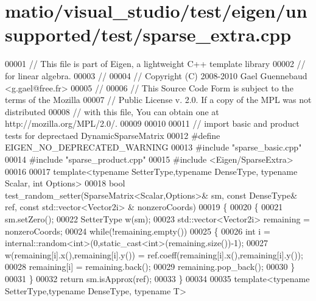 \hypertarget{matio_2visual__studio_2test_2eigen_2unsupported_2test_2sparse__extra_8cpp_source}{}\section{matio/visual\+\_\+studio/test/eigen/unsupported/test/sparse\+\_\+extra.cpp}
\label{matio_2visual__studio_2test_2eigen_2unsupported_2test_2sparse__extra_8cpp_source}

\begin{DoxyCode}
00001 \textcolor{comment}{// This file is part of Eigen, a lightweight C++ template library}
00002 \textcolor{comment}{// for linear algebra.}
00003 \textcolor{comment}{//}
00004 \textcolor{comment}{// Copyright (C) 2008-2010 Gael Guennebaud <g.gael@free.fr>}
00005 \textcolor{comment}{//}
00006 \textcolor{comment}{// This Source Code Form is subject to the terms of the Mozilla}
00007 \textcolor{comment}{// Public License v. 2.0. If a copy of the MPL was not distributed}
00008 \textcolor{comment}{// with this file, You can obtain one at http://mozilla.org/MPL/2.0/.}
00009 
00010 
00011 \textcolor{comment}{// import basic and product tests for deprectaed DynamicSparseMatrix}
00012 \textcolor{preprocessor}{#define EIGEN\_NO\_DEPRECATED\_WARNING}
00013 \textcolor{preprocessor}{#include "sparse\_basic.cpp"}
00014 \textcolor{preprocessor}{#include "sparse\_product.cpp"}
00015 \textcolor{preprocessor}{#include <Eigen/SparseExtra>}
00016 
00017 \textcolor{keyword}{template}<\textcolor{keyword}{typename} SetterType,\textcolor{keyword}{typename} DenseType, \textcolor{keyword}{typename} Scalar, \textcolor{keywordtype}{int} Options>
00018 \textcolor{keywordtype}{bool} test\_random\_setter(SparseMatrix<Scalar,Options>& sm, \textcolor{keyword}{const} DenseType& ref, \textcolor{keyword}{const} std::vector<Vector2i>
      & nonzeroCoords)
00019 \{
00020   \{
00021     sm.setZero();
00022     SetterType w(sm);
00023     std::vector<Vector2i> remaining = nonzeroCoords;
00024     \textcolor{keywordflow}{while}(!remaining.empty())
00025     \{
00026       \textcolor{keywordtype}{int} i = internal::random<int>(0,\textcolor{keyword}{static\_cast<}\textcolor{keywordtype}{int}\textcolor{keyword}{>}(remaining.size())-1);
00027       w(remaining[i].x(),remaining[i].y()) = ref.coeff(remaining[i].x(),remaining[i].y());
00028       remaining[i] = remaining.back();
00029       remaining.pop\_back();
00030     \}
00031   \}
00032   \textcolor{keywordflow}{return} sm.isApprox(ref);
00033 \}
00034 
00035 \textcolor{keyword}{template}<\textcolor{keyword}{typename} SetterType,\textcolor{keyword}{typename} DenseType, \textcolor{keyword}{typename} T>

\end{DoxyCode}

